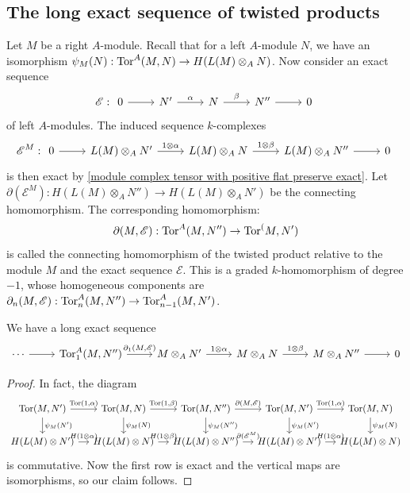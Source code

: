 \subsection{The long exact sequence of twisted products}
Let $M$ be a right $A$-module. Recall that for a left $A$-module $N$, we have an isomorphism $\psi_M(N):\mathrm{Tor}^A(M,N)\to H(L(M)\otimes_AN)$. Now consider an exact sequence
\[\mathscr{E}:\begin{tikzcd}
0\ar[r]&N'\ar[r,"\alpha"]&N\ar[r,"\beta"]&N''\ar[r]&0
\end{tikzcd}\]
of left $A$-modules. The induced sequence $k$-complexes
\[\mathscr{E}^M:\begin{tikzcd}
0\ar[r]&L(M)\otimes_AN'\ar[r,"1\otimes\alpha"]&L(M)\otimes_AN\ar[r,"1\otimes\beta"]&L(M)\otimes_AN''\ar[r]&0
\end{tikzcd}\]
is then exact by \cref{module complex tensor with positive flat preserve exact}. Let $\partial(\mathscr{E}^M):H(L(M)\otimes_AN'')\to H(L(M)\otimes_AN')$ be the connecting homomorphism. The corresponding homomorphism:
\[\partial(M,\mathscr{E}):\mathrm{Tor}^A(M,N'')\to\mathrm{Tor}^(M,N')\]
is called the connecting homomorphism of the twisted product relative to the module $M$ and the exact sequence $\mathscr{E}$. This is a graded $k$-homomorphism of degree $-1$, whose homogeneous components are $\partial_n(M,\mathscr{E}):\mathrm{Tor}^A_n(M,N'')\to\mathrm{Tor}^A_{n-1}(M,N')$.
\begin{theorem}\label{module complex long exact sequence of Tor}
We have a long exact sequence
\[\begin{tikzcd}
\cdots\ar[r]&\Tor_1^A(M,N'')\ar[r,"{\partial_1(M,\mathscr{E})}"]&M\otimes_AN'\ar[r,"1\otimes\alpha"]&M\otimes_AN\ar[r,"1\otimes\beta"]&M\otimes_AN''\ar[r]&0
\end{tikzcd}\]
\end{theorem}
\begin{proof}
In fact, the diagram
\[\begin{tikzcd}[column sep=4mm,row sep=6mm]
\Tor(M,N')\ar[r,"{\Tor(1,\alpha)}"]\ar[d,"\psi_M(N')"]&\Tor(M,N)\ar[r,"{\Tor(1,\beta)}"]\ar[d,"\psi_M(N)"]&\Tor(M,N'')\ar[d,"\psi_M(N'')"]\ar[r,"{\partial(M,\mathscr{E})}"]&\Tor(M,N')\ar[d,"\psi_M(N')"]\ar[r,"{\Tor(1,\alpha)}"]&\Tor(M,N)\ar[d,"\psi_M(N)"]\\
H(L(M)\otimes N')\ar[r,"H(1\otimes\alpha)"]&H(L(M)\otimes N)\ar[r,"H(1\otimes\beta)"]&H(L(M)\otimes N'')\ar[r,"{\partial(\mathscr{E}^M)}"]&H(L(M)\otimes N')\ar[r,"H(1\otimes\alpha)"]&H(L(M)\otimes N)
\end{tikzcd}\]
is commutative. Now the first row is exact and the vertical maps are isomorphisms, so our claim follows.
\end{proof}

